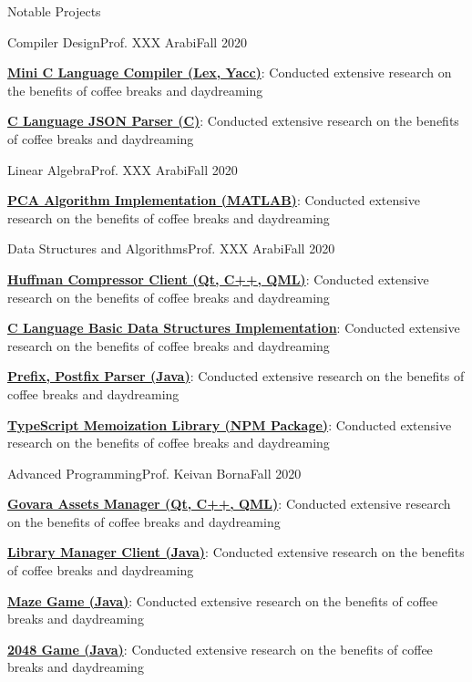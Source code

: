 \documentclass[]{main}
\begin{document}
\begin{section}{Notable Projects}
 \begin{subsection}{Compiler Design}{Prof. XXX Arabi}{Fall 2020}{}
     \item \textbf{\href{https://github.com/ckoliber/minicc}{Mini C Language Compiler (Lex, Yacc)}}: Conducted extensive research on the benefits of coffee breaks and daydreaming
     \item \textbf{\href{https://github.com/ckoliber/Kson}{C Language JSON Parser (C)}}: Conducted extensive research on the benefits of coffee breaks and daydreaming
 \end{subsection}

 \begin{subsection}{Linear Algebra}{Prof. XXX Arabi}{Fall 2020}{}
     \item \textbf{\href{https://github.com/ckoliber/pca}{PCA Algorithm Implementation (MATLAB)}}: Conducted extensive research on the benefits of coffee breaks and daydreaming
 \end{subsection}

 \begin{subsection}{Data Structures and Algorithms}{Prof. XXX Arabi}{Fall 2020}{}
     \item \textbf{\href{https://github.com/ckoliber/kuffman}{Huffman Compressor Client (Qt, C++, QML)}}: Conducted extensive research on the benefits of coffee breaks and daydreaming
     \item \textbf{\href{https://github.com/ckoliber/memoizor}{C Language Basic Data Structures Implementation}}: Conducted extensive research on the benefits of coffee breaks and daydreaming
     \item \textbf{\href{https://github.com/ckoliber/XFixToYFix}{Prefix, Postfix Parser (Java)}}: Conducted extensive research on the benefits of coffee breaks and daydreaming
     \item \textbf{\href{https://github.com/ckoliber/memoizor}{TypeScript Memoization Library (NPM Package)}}: Conducted extensive research on the benefits of coffee breaks and daydreaming
 \end{subsection}

 \begin{subsection}{Advanced Programming}{Prof. Keivan Borna}{Fall 2020}{}
     \item \textbf{\href{https://github.com/ckoliber/govara}{Govara Assets Manager (Qt, C++, QML)}}: Conducted extensive research on the benefits of coffee breaks and daydreaming
     \item \textbf{\href{https://github.com/ckoliber/LibraryManager}{Library Manager Client (Java)}}: Conducted extensive research on the benefits of coffee breaks and daydreaming
     \item \textbf{\href{https://github.com/ckoliber/Maze}{Maze Game (Java)}}: Conducted extensive research on the benefits of coffee breaks and daydreaming
     \item \textbf{\href{https://github.com/ckoliber/2048}{2048 Game (Java)}}: Conducted extensive research on the benefits of coffee breaks and daydreaming
 \end{subsection}
\end{section}
\end{document}
